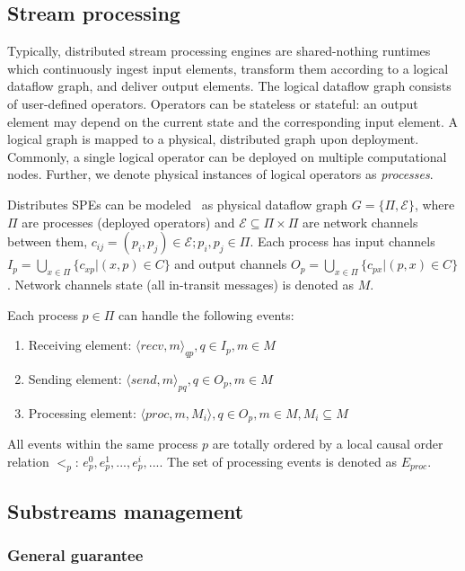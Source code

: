\label{fs-acker-preliminaries}

\subsection{Stream processing}

Typically, distributed stream processing engines are shared-nothing runtimes which continuously ingest input elements, transform them according to a logical dataflow graph, and deliver output elements. The logical dataflow graph consists of user-defined operators. Operators can be stateless or stateful: an output element may depend on the current state and the corresponding input element. A logical graph is mapped to a physical, distributed graph upon deployment. Commonly, a single logical operator can be deployed on multiple computational nodes. Further, we denote physical instances of logical operators as {\em processes}.

Distributes SPEs can be modeled~\cite{carbone2018scalable} as physical dataflow graph $G=\{\Pi,\mathcal{E}\}$, where $\Pi$ are processes (deployed operators) and $\mathcal{E} \subseteq \Pi \times \Pi$ are network channels between them, $c_{ij}=(p_i,p_j)\in \mathcal{E}; p_i,p_j \in \Pi$. Each process has input channels $I_p = \bigcup_{x \in \Pi} \{c_{xp} | (x,p) \in C\}$ and output channels $O_p = \bigcup_{x \in \Pi} \{c_{px} | (p,x) \in C\}$. Network channels state (all in-transit messages) is denoted as $M$. 

Each process $p\in \Pi$ can handle the following events:
\begin{enumerate}
    \item Receiving element: $\langle recv,m\rangle_{qp}, q\in I_p, m\in M$
    \item Sending element: $\langle send,m\rangle_{pq}, q\in O_p, m\in M$
    \item Processing element: $\langle proc,m,M_i\rangle, q\in O_p, m\in M, M_i \subseteq M$
\end{enumerate}

All events within the same process $p$ are totally ordered by a local causal order relation $<_p$: $e^{0}_p,e^{1}_p,...,e^{i}_p,...$. The set of processing events is denoted as $E_{proc}$.

\subsection{Substreams management}

\subsubsection{General guarantee}

